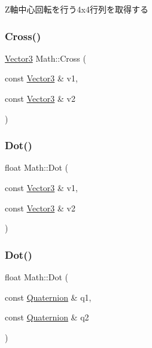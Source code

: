 Z軸中心回転を行う4x4行列を取得する 

\mbox{\label{namespace_math_a3e7d67884adf533a55598952787420b2}} 
\subsubsection{\texorpdfstring{Cross()}{Cross()}}
{\footnotesize\ttfamily \mbox{\hyperlink{struct_math_1_1_vector3}{Vector3}} Math\+::\+Cross (\begin{DoxyParamCaption}\item[{const \mbox{\hyperlink{struct_math_1_1_vector3}{Vector3}} \&}]{v1,  }\item[{const \mbox{\hyperlink{struct_math_1_1_vector3}{Vector3}} \&}]{v2 }\end{DoxyParamCaption})}

\mbox{\label{namespace_math_a1b728d3fd626ed55895d4b59575e071a}} 
\subsubsection{\texorpdfstring{Dot()}{Dot()}\hspace{0.1cm}{\footnotesize\ttfamily [1/2]}}
{\footnotesize\ttfamily float Math\+::\+Dot (\begin{DoxyParamCaption}\item[{const \mbox{\hyperlink{struct_math_1_1_vector3}{Vector3}} \&}]{v1,  }\item[{const \mbox{\hyperlink{struct_math_1_1_vector3}{Vector3}} \&}]{v2 }\end{DoxyParamCaption})}

\mbox{\label{namespace_math_af75856a56466e76f5c6308cc78eab656}} 
\subsubsection{\texorpdfstring{Dot()}{Dot()}\hspace{0.1cm}{\footnotesize\ttfamily [2/2]}}
{\footnotesize\ttfamily float Math\+::\+Dot (\begin{DoxyParamCaption}\item[{const \mbox{\hyperlink{struct_math_1_1_quaternion}{Quaternion}} \&}]{q1,  }\item[{const \mbox{\hyperlink{struct_math_1_1_quaternion}{Quaternion}} \&}]{q2 }\end{DoxyParamCaption})}




